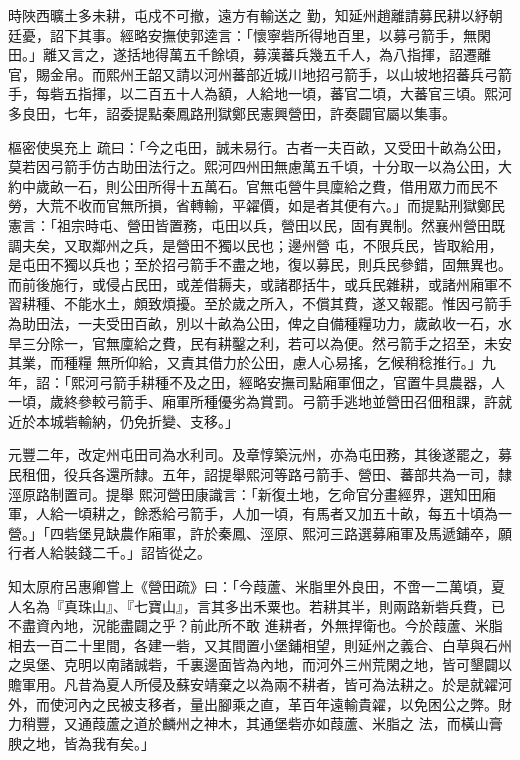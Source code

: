 \begin{pinyinscope}
 時陜西曠土多未耕，屯戍不可撤，遠方有輸送之
 勤，知延州趙離請募民耕以紓朝廷憂，詔下其事。經略安撫使郭逵言：「懷寧砦所得地百里，以募弓箭手，無閑田。」離又言之，遂括地得萬五千餘頃，募漢蕃兵幾五千人，為八指揮，詔遷離官，賜金帛。而熙州王韶又請以河州蕃部近城川地招弓箭手，以山坡地招蕃兵弓箭手，每砦五指揮，以二百五十人為額，人給地一頃，蕃官二頃，大蕃官三頃。熙河多良田，七年，詔委提點秦鳳路刑獄鄭民憲興營田，許奏闢官屬以集事。



 樞密使吳充上
 疏曰：「今之屯田，誠未易行。古者一夫百畝，又受田十畝為公田，莫若因弓箭手仿古助田法行之。熙河四州田無慮萬五千頃，十分取一以為公田，大約中歲畝一石，則公田所得十五萬石。官無屯營牛具廩給之費，借用眾力而民不勞，大荒不收而官無所損，省轉輸，平糴價，如是者其便有六。」而提點刑獄鄭民憲言：「祖宗時屯、營田皆置務，屯田以兵，營田以民，固有異制。然襄州營田既調夫矣，又取鄰州之兵，是營田不獨以民也；邊州營
 屯，不限兵民，皆取給用，是屯田不獨以兵也；至於招弓箭手不盡之地，復以募民，則兵民參錯，固無異也。而前後施行，或侵占民田，或差借耨夫，或諸郡括牛，或兵民雜耕，或諸州廂軍不習耕種、不能水土，頗致煩擾。至於歲之所入，不償其費，遂又報罷。惟因弓箭手為助田法，一夫受田百畝，別以十畝為公田，俾之自備種糧功力，歲畝收一石，水旱三分除一，官無廩給之費，民有耕鑿之利，若可以為便。然弓箭手之招至，未安其業，而種糧
 無所仰給，又責其借力於公田，慮人心易搖，乞候稍稔推行。」九年，詔：「熙河弓箭手耕種不及之田，經略安撫司點廂軍佃之，官置牛具農器，人一頃，歲終參較弓箭手、廂軍所種優劣為賞罰。弓箭手逃地並營田召佃租課，許就近於本城砦輸納，仍免折變、支移。」



 元豐二年，改定州屯田司為水利司。及章惇築沅州，亦為屯田務，其後遂罷之，募民租佃，役兵各還所隸。五年，詔提舉熙河等路弓箭手、營田、蕃部共為一司，隸涇原路制置司。提舉
 熙河營田康識言：「新復土地，乞命官分畫經界，選知田廂軍，人給一頃耕之，餘悉給弓箭手，人加一頃，有馬者又加五十畝，每五十頃為一營。」「四砦堡見缺農作廂軍，許於秦鳳、涇原、熙河三路選募廂軍及馬遞鋪卒，願行者人給裝錢二千。」詔皆從之。



 知太原府呂惠卿嘗上《營田疏》曰：「今葭蘆、米脂里外良田，不啻一二萬頃，夏人名為『真珠山』、『七寶山』，言其多出禾粟也。若耕其半，則兩路新砦兵費，已不盡資內地，況能盡闢之乎？前此所不敢
 進耕者，外無捍衛也。今於葭蘆、米脂相去一百二十里間，各建一砦，又其間置小堡鋪相望，則延州之義合、白草與石州之吳堡、克明以南諸誠砦，千裏邊面皆為內地，而河外三州荒閑之地，皆可墾闢以贍軍用。凡昔為夏人所侵及蘇安靖棄之以為兩不耕者，皆可為法耕之。於是就糴河外，而使河內之民被支移者，量出腳乘之直，革百年遠輸貴糴，以免困公之弊。財力稍豐，又通葭蘆之道於麟州之神木，其通堡砦亦如葭蘆、米脂之
 法，而橫山膏腴之地，皆為我有矣。」




\end{pinyinscope}
